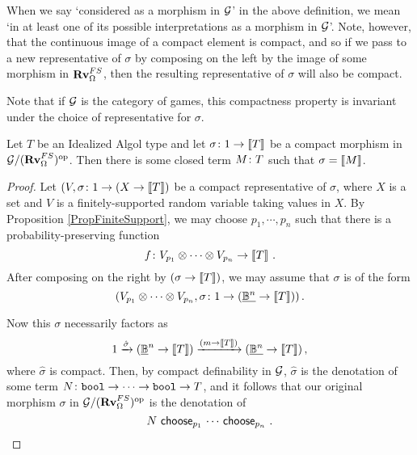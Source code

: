 \documentclass{report}[11pt]
\begin{document}
\begin{remark}
  When we say `considered as a morphism in $\G$' in the above definition, we mean `in at least one of its possible interpretations as a morphism in $\G$'.  
  Note, however, that the continuous image of a compact element is compact, and so if we pass to a new representative of $\sigma$ by composing on the left by the image of some morphism in $\Rv_{\Omega}^{FS}$, then the resulting representative of $\sigma$ will also be compact.

  Note that if $\G$ is the category of games, this compactness property is invariant under the choice of representative for $\sigma$.
\end{remark}

\begin{proposition}
  Let $T$ be an Idealized Algol type and let $\sigma \from 1 \to \deno{T}$ be a compact morphism in $\G/\oppcat{(\Rv_{\Omega}^{FS})}$.  
  Then there is some closed term $M\from T$ such that $\sigma = \deno{M}$.
  \label{PropProbabilityCompactDefinability}
\end{proposition}
\begin{proof}
  Let $(V, \sigma \from 1 \to (X \to \deno{T})$ be a compact representative of $\sigma$, where $X$ is a set and $V$ is a finitely-supported random variable taking values in $X$.  
  By Proposition \ref{PropFiniteSupport}, we may choose $p_1,\cdots,p_n$ such that there is a probability-preserving function
  \[
    f \from V_{p_1} \tensor \cdots \tensor V_{p_n} \to \deno{T}\,.
    \]
  After composing on the right by $(\sigma \to \deno{T})$, we may assume that $\sigma$ is of the form
  \[
    (V_{p_1}\tensor\cdots\tensor V_{p_n}, \sigma \from 1 \to (\ul{\bB^n} \to \deno{T}))\,.
    \]

  Now this $\sigma$ necessarily factors as
  \[
    1 \xrightarrow{\hat{\sigma}}
    (\ul{\bB}^n \to \deno T) \xrightarrow{(m \to \deno T)}
    (\ul{\bB^n} \to \deno T)\,,
    \]
  where $\hat{\sigma}$ is compact.  
  Then, by compact definability in $\G$, $\hat\sigma$ is the denotation of some term $N \from \bool \to \cdots \to \bool \to T$, and it follows that our original morphism $\sigma$ in $\G/\oppcat{(\Rv_{\Omega}^{FS})}$ is the denotation of
  \[
    N\,\choose_{p_1}\,\cdots\,\choose_{p_n}\,.\qedhere
    \]
\end{proof}
\end{document}
